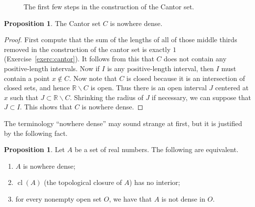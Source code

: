 \documentclass[11pt,oneside]{amsart}
\DeclareMathOperator{\cl}{cl}
\newcommand{\RR}{\mathbb R}
\theoremstyle{definition}
\newtheorem{prop}[thm]{Proposition}
\theoremstyle{definition}
\theoremstyle{remark}
\begin{document}
\begin{figure}[h]
\begin{center}
\end{center}
\caption{The first few steps in the construction of the Cantor set.\label{fig:cantor-set}}
\end{figure}

\begin{prop}
  The Cantor set $C$ is nowhere dense.
\end{prop}

\begin{proof}
  First compute that the sum of the lengths of all of those middle thirds removed in the construction of the cantor set is exactly $1$ (Exercise~\ref{exerc:cantor}). It follows from this that $C$ does not contain any positive-length intervals. Now if $I$ is any positive-length interval, then $I$ must contain a point $x\notin C$. Now note that $C$ is closed because it is an intersection of closed sets, and hence $\RR\smallsetminus C$ is open. Thus there is an open interval $J$ centered at $x$ such that $J\subset\RR\smallsetminus C$. Shrinking the radius of $J$ if necessary, we can suppose that $J\subset I$. This shows that $C$ is nowhere dense.
\end{proof}

The terminology ``nowhere dense'' may sound strange at first, but it is justified by the following fact.

\begin{prop}
  \label{prop:nwd-equiv}
  Let $A$ be a set of real numbers. The following are equivalent.
\begin{enumerate}
\item $A$ is nowhere dense;
\item $\cl(A)$ (the topological closure of $A$) has no interior;
\item for every nonempty open set $O$, we have that $A$ is not dense in $O$.
\end{enumerate}
\end{prop}
\end{document}
